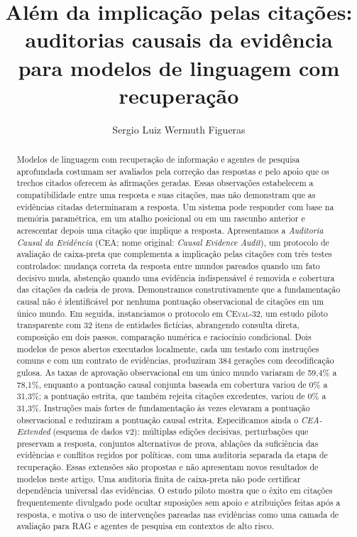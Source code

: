 \documentclass[10pt,twocolumn]{article}
\title{Além da implicação pelas citações: auditorias causais da evidência para modelos de linguagem com recuperação}
\author{Sergio Luiz Wermuth Figueras}
\date{}
\newcommand{\method}{\textsc{CEA}}
\newcommand{\dataset}{\textsc{CEval-32}}
\begin{document}
\maketitle

\begin{abstract}
Modelos de linguagem com recuperação de informação e agentes de pesquisa aprofundada costumam ser avaliados pela correção das respostas e pelo apoio que os trechos citados oferecem às afirmações geradas. Essas observações estabelecem a compatibilidade entre uma resposta e suas citações, mas não demonstram que as evidências citadas determinaram a resposta. Um sistema pode responder com base na memória paramétrica, em um atalho posicional ou em um rascunho anterior e acrescentar depois uma citação que implique a resposta. Apresentamos a \emph{Auditoria Causal da Evidência} (\method; nome original: \emph{Causal Evidence Audit}), um protocolo de avaliação de caixa-preta que complementa a implicação pelas citações com três testes controlados: mudança correta da resposta entre mundos pareados quando um fato decisivo muda, abstenção quando uma evidência indispensável é removida e cobertura das citações da cadeia de prova. Demonstramos construtivamente que a fundamentação causal não é identificável por nenhuma pontuação observacional de citações em um único mundo. Em seguida, instanciamos o protocolo em \dataset, um estudo piloto transparente com 32 itens de entidades fictícias, abrangendo consulta direta, composição em dois passos, comparação numérica e raciocínio condicional. Dois modelos de pesos abertos executados localmente, cada um testado com instruções comuns e com um contrato de evidências, produziram 384 gerações com decodificação gulosa. As taxas de aprovação observacional em um único mundo variaram de 59,4\% a 78,1\%, enquanto a pontuação causal conjunta baseada em cobertura variou de 0\% a 31,3\%; a pontuação estrita, que também rejeita citações excedentes, variou de 0\% a 31,3\%. Instruções mais fortes de fundamentação às vezes elevaram a pontuação observacional e reduziram a pontuação causal estrita. Especificamos ainda o \emph{CEA-Extended} (esquema de dados v2): múltiplas edições decisivas, perturbações que preservam a resposta, conjuntos alternativos de prova, ablações da suficiência das evidências e conflitos regidos por políticas, com uma auditoria separada da etapa de recuperação. Essas extensões são propostas e não apresentam novos resultados de modelos neste artigo. Uma auditoria finita de caixa-preta não pode certificar dependência universal das evidências. O estudo piloto mostra que o êxito em citações frequentemente divulgado pode ocultar suposições sem apoio e atribuições feitas após a resposta, e motiva o uso de intervenções pareadas nas evidências como uma camada de avaliação para RAG e agentes de pesquisa em contextos de alto risco.
\end{abstract}
\end{document}
